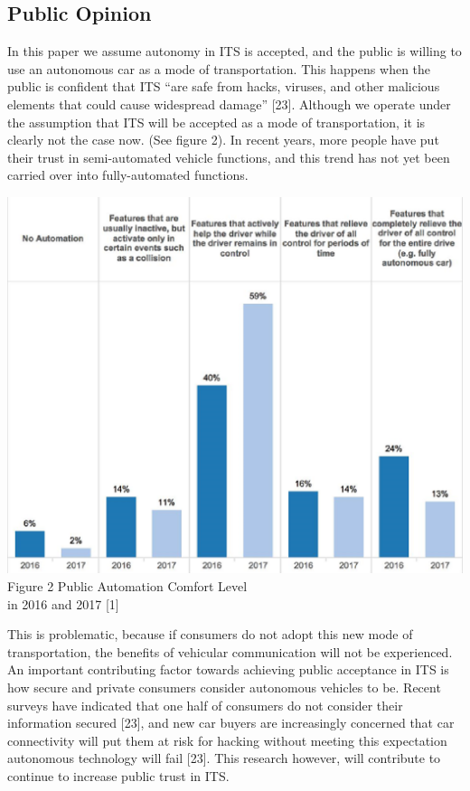 \documentclass[conference,compsoc]{IEEEtran}
\begin{document}
\subsection{Public Opinion}
In this paper we assume autonomy in ITS is accepted, and the public is willing to use an autonomous car as a mode of transportation. This happens when the public is confident that ITS “are safe from hacks, viruses, and other malicious elements that could cause widespread damage” [23]. Although we operate under the assumption that ITS will be accepted as a mode of transportation, it is clearly not the case now. (See figure 2). In recent years, more people have put their trust in semi-automated vehicle functions, and this trend has not yet been carried over into fully-automated functions.
\begin{center}
\includegraphics[scale = .3]{opinion.png}\\
\small{Figure 2 Public Automation Comfort Level\\ in 2016 and 2017 [1]}
\break
\end{center}
This is problematic, because if consumers do not adopt this new mode of transportation, the benefits of vehicular communication will not be experienced. An important contributing factor towards achieving public acceptance in ITS is how secure and private consumers consider autonomous vehicles to be. Recent surveys have indicated that one half of consumers do not consider their information secured [23], and new car buyers are increasingly concerned that car connectivity will put them at risk for hacking without meeting this expectation autonomous technology will fail [23]. This research however, will contribute to continue to increase public trust in ITS.
\end{document}
